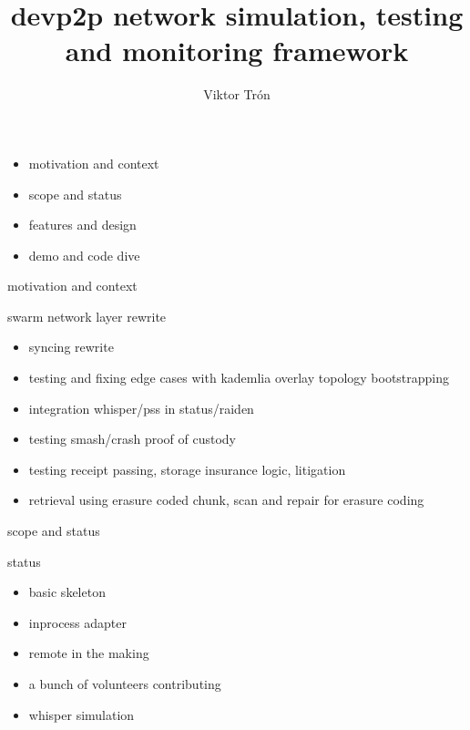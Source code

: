 \documentclass{beamer}
\title{devp2p network simulation, testing and monitoring framework}
\author{Viktor Trón}
\begin{document}
\begin{frame}
 \titlepage
\end{frame}

\begin{frame}
\begin{block}{}
\begin{itemize}
\item motivation and context
\item scope and status
\item features and design
\item demo and code dive
\end{itemize}
\end{block}
\end{frame}

\begin{section}{motivation and context}


\begin{frame}{}
\begin{block}{swarm network layer rewrite}
 \begin{itemize}
    \item syncing rewrite
    \item testing and fixing edge cases with kademlia overlay topology bootstrapping
    \item integration whisper/pss in status/raiden
    \item testing smash/crash proof of custody
    \item testing receipt passing, storage insurance logic, litigation
    \item retrieval using erasure coded chunk, scan and repair for erasure coding
\end{itemize}
\end{block}
\end{frame}



\end{section}

\begin{section}{scope and status}


\begin{frame}{}
\begin{block}{status}
 \begin{itemize}
    \item basic skeleton
    \item inprocess adapter
    \item remote in the making
    \item a bunch of volunteers contributing
    \item whisper simulation
\end{itemize}
\end{block}
\end{frame}

\end{section}
\end{document}
